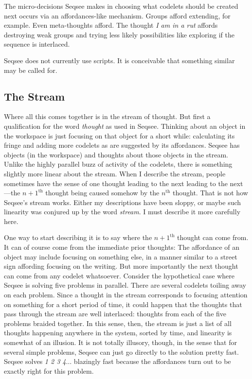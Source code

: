 \documentclass[letterpaper]{article}
\begin{document}
The micro-decisions Seqsee makes in choosing what codelets should be created next occurs via an affordances-like mechanism. Groups afford extending, for example.  Even meta-thoughts afford.  The thought \emph{I am in a rut} affords destroying weak groups and trying less likely possibilities like exploring if the sequence is interlaced.

Seqsee does not currently use scripts.  It is conceivable that something similar may be called for. 

\subsection{The Stream}
\label{sec:stream}

Where all this comes together is in the stream of thought. But first a qualification for the word \emph{thought} as used in Seqsee. Thinking about an object in the workspace is just focusing on that object for a short while: calculating its fringe and adding more codelets as are suggested by its affordances. Seqsee has objects (in the workspace) and thoughts about those objects in the stream.  Unlike the highly parallel buzz of activity of the codelets, there is something slightly more linear about the stream.  When I describe the stream, people sometimes have the sense of one thought leading to the next leading to the next---the $n+1^{\mathrm{th}}$ thought being caused somehow by the $n^\mathrm{th}$ thought. That is not how Seqsee's stream works. Either my descriptions have been sloppy, or maybe such linearity was conjured up by the word \emph{stream}. I must describe it more carefully here.

One way to start describing it is to say where the $n+1^{\mathrm{th}}$ thought can come from.  It can of course come  from the immediate prior thoughts: The affordance of an object may include focusing on something else, in a manner similar to a street sign affording focusing on the writing. But more importantly the next thought can come from any codelet whatsoever.  Consider the hypothetical case where Seqsee is solving five problems in parallel.  There are several codelets toiling away on each problem.  Since a thought in the stream corresponds to focusing attention on something for a short period of time, it could happen that the thoughts that pass through the stream are well interlaced: thoughts from each of the five problems braided together. In this sense, then, the stream is just a list of all thoughts happening anywhere in the system, sorted by time, and linearity is somewhat of an illusion. It is not totally illusory, though, in the sense that for several simple problems, Seqsee can just go directly to the solution pretty fast. Seqsee solves \emph{1 2 3 4$\ldots$} blazingly fast because the affordances turn out to be exactly right for this problem.
\end{document}
